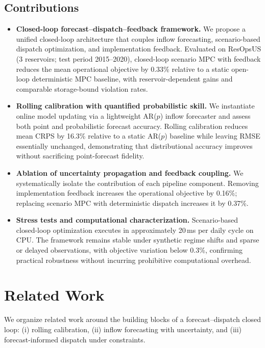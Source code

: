 \documentclass[conference]{IEEEtran}
\begin{document}
\subsection{Contributions}
\begin{itemize}[leftmargin=*]
\item[\textbf{C1}] \textbf{Closed-loop forecast--dispatch--feedback framework.}
We propose a unified closed-loop architecture that couples inflow forecasting, scenario-based dispatch optimization, and implementation feedback. Evaluated on ResOpsUS (3 reservoirs; test period 2015--2020), closed-loop scenario MPC with feedback reduces the mean operational objective by 0.33\% relative to a static open-loop deterministic MPC baseline, with reservoir-dependent gains and comparable storage-bound violation rates.

\item[\textbf{C2}] \textbf{Rolling calibration with quantified probabilistic skill.}
We instantiate online model updating via a lightweight AR($p$) inflow forecaster and assess both point and probabilistic forecast accuracy. Rolling calibration reduces mean CRPS by 16.3\% relative to a static AR($p$) baseline while leaving RMSE essentially unchanged, demonstrating that distributional accuracy improves without sacrificing point-forecast fidelity.

\item[\textbf{C3}] \textbf{Ablation of uncertainty propagation and feedback coupling.}
We systematically isolate the contribution of each pipeline component. Removing implementation feedback increases the operational objective by 0.16\%; replacing scenario MPC with deterministic dispatch increases it by 0.37\%.

\item[\textbf{C4}] \textbf{Stress tests and computational characterization.}
Scenario-based closed-loop optimization executes in approximately 20\,ms per daily cycle on CPU. The framework remains stable under synthetic regime shifts and sparse or delayed observations, with objective variation below 0.3\%, confirming practical robustness without incurring prohibitive computational overhead.
\end{itemize}

\section{Related Work}
We organize related work around the building blocks of a forecast--dispatch closed loop:
(i) rolling calibration, (ii) inflow forecasting with uncertainty, and (iii) forecast-informed
dispatch under constraints.
\end{document}
